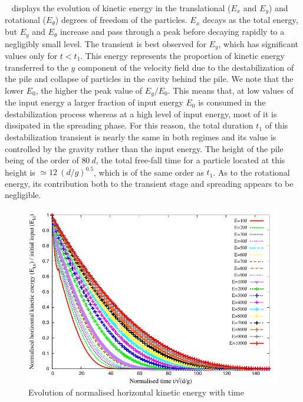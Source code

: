 ~ displays the evolution of kinetic energy 
in the translational ($E_x$ and $E_y$) and rotational ($E_\theta$) 
degrees of freedom of the particles. $E_x$ decays as the total 
energy, but $E_y$ and $E_\theta$ increase and pass through a peak before 
decaying rapidly to a negligibly small level. The transient is best observed 
for $E_y$, which has significant values only for $t< t_1$. This energy 
represents the proportion of kinetic energy transferred to the $y$ component of 
the velocity field  due to the destabilization of the pile and collapse of 
particles in the cavity behind the pile. We note that the lower $E_0$, the 
higher the peak value of $E_y/E_0$. 
This means that, at low values of the input energy a larger fraction 
of input energy $E_0$ is consumed in the destabilization process whereas 
at a high level of input energy, most of it is dissipated in the spreading 
phase. For this reason, the total duration $t_1$ of this destabilization 
transient is nearly the same in both regimes and its value is controlled by the 
gravity rather than the input energy. The height of the pile being of the order 
of $80 \ d$, the total free-fall time for a particle located at this height is 
$\simeq 12 \ (d/g)^{0.5}$, which is of the same order as $t_1$. As to the 
rotational energy, its contribution both to the transient stage and spreading 
appears to be negligible. 

\begin{figure}[tbhp]
\centering
\includegraphics[width=\textwidth]{Normalised_KEx_Slope}
\caption{Evolution of normalised horizontal kinetic energy with time}
\label{fig:Normalised_KEx_Slope}
\end{figure}

